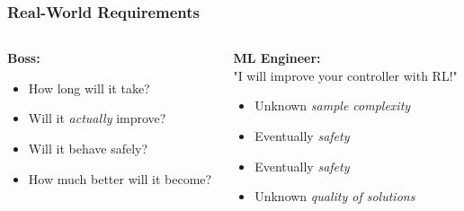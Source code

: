 \documentclass{beamer}
\begin{document}
\begin{frame}
\frametitle{Real-World Requirements}
\begin{columns}
	\begin{column}[t]{.5\textwidth}
		{\bf Boss:}\\
		\phantom{"I will improve your controller with RL!"}
		\vspace{1cm}
		\begin{itemize}
			\setlength{\itemsep}{10pt}
			\item How long will it take?
			\item Will it \emph{actually} improve?
			\item Will it behave safely?
			\item How much better will it become?
		\end{itemize}
	\end{column}
	\begin{column}[t]{.5\textwidth}
	{\bf ML Engineer:}\\ 
	"I will improve your controller with RL!"
	\vspace{1cm}
	\begin{itemize}
		\setlength{\itemsep}{10pt}
		\item[] Unknown \hfill \emph{sample complexity}
		\item[] Eventually \hfill \emph{safety}
		\item[] Eventually \hfill \emph{safety}
		\item[] Unknown \hfill \emph{quality of solutions}
	\end{itemize}
	\end{column}
\end{columns}
\end{frame}


\end{document}
